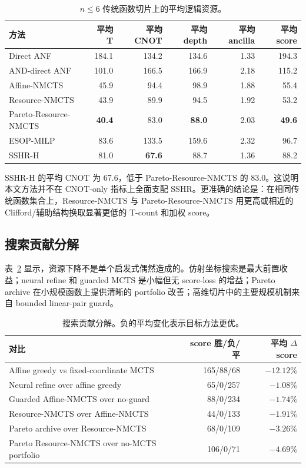 \documentclass[UTF8,fontset=macnew,11pt]{ctexart}
\newcommand{\method}{Resource-NMCTS}
\newcommand{\pareto}{Pareto-Resource-NMCTS}
\begin{document}
\begin{table}[t]
\centering
\small
\caption{$n\leq6$ 传统函数切片上的平均逻辑资源。}
\label{tab:traditional_mean}
\begin{tabular}{lrrrrr}
\toprule
方法 & 平均 T & 平均 CNOT & 平均 depth & 平均 ancilla & 平均 score \\
\midrule
Direct ANF & 184.1 & 134.2 & 134.6 & 1.33 & 194.3 \\
AND-direct ANF & 101.0 & 166.5 & 166.9 & 2.18 & 115.2 \\
Affine-NMCTS & 45.9 & 94.4 & 98.9 & 1.88 & 55.4 \\
\method{} & 43.9 & 89.9 & 94.5 & 1.92 & 53.2 \\
\pareto{} & \textbf{40.4} & 83.0 & \textbf{88.0} & 2.03 & \textbf{49.6} \\
ESOP-MILP & 83.6 & 133.5 & 159.6 & 2.32 & 96.7 \\
SSHR-H & 81.0 & \textbf{67.6} & 88.7 & 1.36 & 88.2 \\
\bottomrule
\end{tabular}
\end{table}

SSHR-H 的平均 CNOT 为 67.6，低于 \pareto{} 的 83.0。这说明本文方法并不在 CNOT-only 指标上全面支配 SSHR。更准确的结论是：在相同传统函数集合上，\method{} 与 \pareto{} 用更高或相近的 Clifford/辅助结构换取显著更低的 T-count 和加权 score。

\subsection{搜索贡献分解}

表~\ref{tab:contribution} 显示，资源下降不是单个启发式偶然造成的。仿射坐标搜索是最大前置收益；neural refine 和 guarded MCTS 是小幅但无 score-loss 的增益；Pareto archive 在小规模函数上提供清晰的 portfolio 改善；高维切片中的主要规模机制来自 bounded linear-pair guard。

\begin{table}[t]
\centering
\small
\caption{搜索贡献分解。负的平均变化表示目标方法更优。}
\label{tab:contribution}
\begin{tabularx}{\linewidth}{>{\raggedright\arraybackslash}Xrr}
\toprule
对比 & score 胜/负/平 & 平均 $\Delta$ score \\
\midrule
Affine greedy vs fixed-coordinate MCTS & 165/88/68 & $-12.12\%$ \\
Neural refine over affine greedy & 65/0/257 & $-1.08\%$ \\
Guarded Affine-NMCTS over no-guard & 88/0/234 & $-1.74\%$ \\
Resource-NMCTS over Affine-NMCTS & 44/0/133 & $-1.91\%$ \\
Pareto archive over Resource-NMCTS & 68/0/109 & $-3.26\%$ \\
Pareto Resource-NMCTS over no-MCTS portfolio & 106/0/71 & $-4.69\%$ \\
\bottomrule
\end{tabularx}
\end{table}
\end{document}
